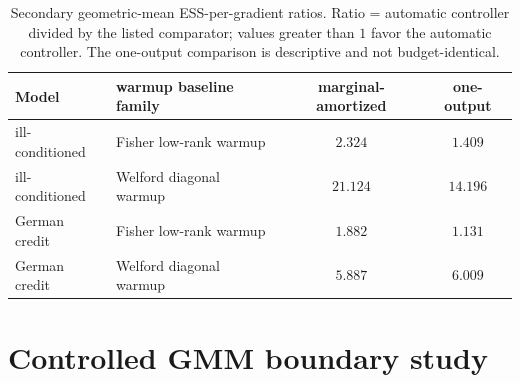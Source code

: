 \documentclass[11pt]{article}
\theoremstyle{plain}
\theoremstyle{definition}
\theoremstyle{remark}
\begin{document}
\begin{table}[htbp]\centering
\caption{Secondary geometric-mean ESS-per-gradient ratios. Ratio = automatic
controller divided by the listed comparator; values greater than $1$ favor the
automatic controller. The one-output comparison is descriptive and not
budget-identical.}
\label{tab:secondary-eff}
\small
\begin{tabular}{@{}llcc@{}}
\toprule
Model & warmup baseline family & marginal-amortized & one-output \\
\midrule
ill-conditioned & Fisher low-rank warmup & $2.324$ & $1.409$ \\
ill-conditioned & Welford diagonal warmup & $21.124$ & $14.196$ \\
German credit & Fisher low-rank warmup & $1.882$ & $1.131$ \\
German credit & Welford diagonal warmup & $5.887$ & $6.009$ \\
\bottomrule
\end{tabular}
\end{table}

\section{Controlled GMM boundary study}\label{app:gmm-boundary}
\end{document}
